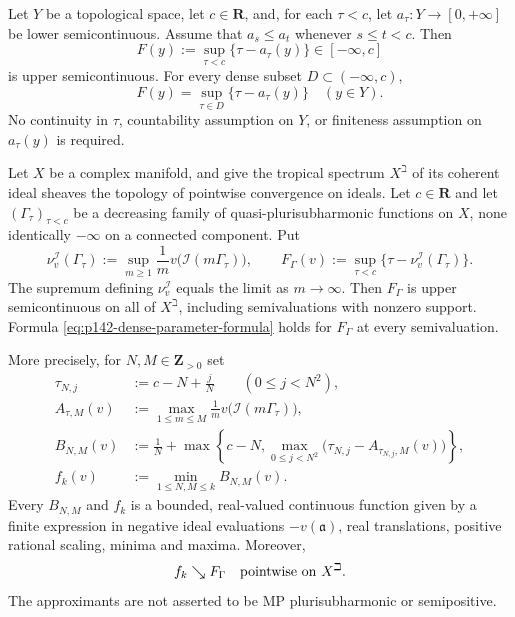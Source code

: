 \begin{lemma}\label{lem:p142-monotone-parameter-supremum}
Let $Y$ be a topological space, let $c\in\mathbf R$, and, for each
$\tau<c$, let $a_\tau:Y\to[0,+\infty]$ be lower semicontinuous.
Assume that $a_s\leq a_t$ whenever $s\leq t<c$. Then
\[
 F(y):=\sup_{\tau<c}\{\tau-a_\tau(y)\}
 \in[-\infty,c]
\]
is upper semicontinuous. For every dense subset $D\subset(-\infty,c)$,
\begin{equation}
 F(y)=\sup_{\tau\in D}\{\tau-a_\tau(y)\}
 \quad(y\in Y).
 \label{eq:p142-dense-parameter-formula}
\end{equation}
No continuity in $\tau$, countability assumption on $Y$, or finiteness
assumption on $a_\tau(y)$ is required.
\end{lemma}

\begin{theorem}\label{thm:p142-raw-transform-usc}
Let $X$ be a complex manifold, and give the tropical spectrum $X^\beth$
of its coherent ideal sheaves the topology of pointwise convergence on
ideals. Let $c\in\mathbf R$ and let $(\Gamma_\tau)_{\tau<c}$ be a
decreasing family of quasi-plurisubharmonic functions on $X$, none
identically $-\infty$ on a connected component. Put
\begin{equation}
 \nu_v^{\mathcal I}(\Gamma_\tau)
 :=\sup_{m\geq1}\frac1m v\bigl(\mathcal I(m\Gamma_\tau)\bigr),
 \qquad
 F_\Gamma(v):=\sup_{\tau<c}
       \{\tau-\nu_v^{\mathcal I}(\Gamma_\tau)\}.
 \label{eq:p142-raw-transform}
\end{equation}
The supremum defining $\nu_v^{\mathcal I}$ equals the limit as
$m\to\infty$. Then $F_\Gamma$ is upper semicontinuous on all of
$X^\beth$, including semivaluations with nonzero support. Formula
\eqref{eq:p142-dense-parameter-formula} holds for $F_\Gamma$ at every
semivaluation.

More precisely, for $N,M\in\mathbf Z_{>0}$ set
\begin{align}
 \tau_{N,j}&:=c-N+\frac jN \qquad(0\leq j<N^2),
 \label{eq:p142-mesh}\\
 A_{\tau,M}(v)&:=\max_{1\leq m\leq M}
       \frac1m v\bigl(\mathcal I(m\Gamma_\tau)\bigr),
 \label{eq:p142-finite-ideal-values}\\
 B_{N,M}(v)&:=\frac1N+
   \max\left\{c-N,
       \max_{0\leq j<N^2}
        \bigl(\tau_{N,j}-A_{\tau_{N,j},M}(v)\bigr)\right\},
 \label{eq:p142-upper-approximants}\\
 f_k(v)&:=\min_{1\leq N,M\leq k}B_{N,M}(v).
 \label{eq:p142-decreasing-sequence}
\end{align}
Every $B_{N,M}$ and $f_k$ is a bounded, real-valued continuous function
given by a finite expression in negative ideal evaluations $-v(\mathfrak a)$,
real translations, positive rational scaling, minima and maxima. Moreover,
\begin{equation}
 f_k\searrow F_\Gamma\quad\hbox{pointwise on }X^\beth.
 \label{eq:p142-exact-sequential-limit}
\end{equation}
The approximants are not asserted to be MP plurisubharmonic or
semipositive.
\end{theorem}

